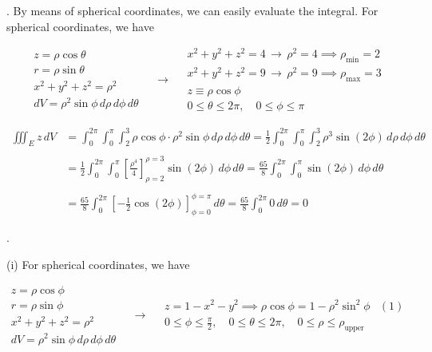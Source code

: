 \documentclass{article}
\begin{document}
\hfill

. By means of spherical coordinates, we can easily evaluate the integral. For spherical coordinates, we have

\[
\begin{array}{c}
z=\rho\cos\theta\\
r=\rho\sin\theta\\
x^2+y^2+z^2=\rho^2\\
dV=\rho^2\sin\phi\,d\rho\,d\phi\,d\theta
\end{array}\quad\rightarrow\quad
\begin{array}{c}
x^2+y^2+z^2=4\,\rightarrow\,\rho^2 = 4\implies \rho_{\text{min}}=2\\
x^2+y^2+z^2=9\,\rightarrow\,\rho^2 = 9\implies \rho_{\text{max}}=3\\
z\equiv\rho\cos\phi\\
0\leq\theta\leq2\pi,\quad0\leq\phi\leq\pi
\end{array}
\]

\begin{align*}
\iiint_Ez\,dV&=\int_0^{2\pi}\int_0^\pi\int_2^3\rho\cos\phi\cdot\rho^2\sin\phi\,d\rho\,d\phi\,d\theta=\frac12\int_0^{2\pi}\int_0^\pi\int_2^3\rho^3\sin(2\phi)\,d\rho\,d\phi\,d\theta\\\\&=\frac12\int_0^{2\pi}\int_0^\pi\left[\frac{\rho^4}{4}\right]_{\rho=2}^{\rho=3}\sin(2\phi)\,d\phi\,d\theta=\frac{65}{8}\int_0^{2\pi}\int_0^\pi\sin(2\phi)\,d\phi\,d\theta\\\\&=\frac{65}{8}\int_0^{2\pi}\left[-\frac12\cos(2\phi)\right]_{\phi=0}^{\phi=\pi}\,d\theta=\frac{65}{8}\int_0^{2\pi}0\,d\theta =\boxed0
\end{align*}

\newpage

.

\hfill

\noindent (i) For spherical coordinates, we have

\[
\begin{array}{c}
z=\rho\cos\phi\\
r=\rho\sin\phi\\
x^2+y^2+z^2=\rho^2\\
dV=\rho^2\sin\phi\,d\rho\,d\phi\,d\theta
\end{array}\quad\rightarrow\quad
\begin{array}{cc}
z=1-x^2-y^2\implies\rho\cos\phi=1-\rho^2\sin^2\phi&(1)\\[0.3cm]
\displaystyle0\leq\phi\leq\frac\pi2,\quad0\leq\theta\leq2\pi,\quad0\leq\rho\leq\rho_{\text{upper}}
\end{array}
\]
\end{document}
